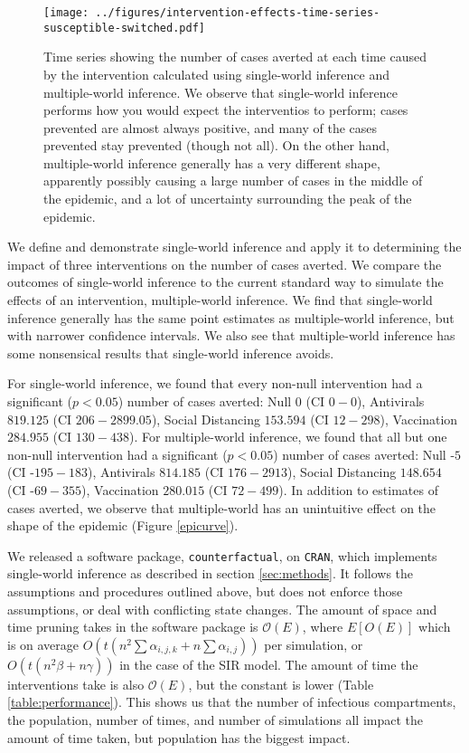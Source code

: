 \documentclass[PTRSB]{rsos}
\begin{document}
\begin{figure}[hp]
\centering
\texttt{[image: ../figures/intervention-effects-time-series-susceptible-switched.pdf]}
\caption{Time series showing the number of cases averted at each time caused by the intervention calculated using single-world inference and multiple-world inference.  We observe that single-world inference performs how you would expect the interventios to perform; cases prevented are almost always positive, and many of the cases prevented stay prevented (though not all). On the other hand, multiple-world inference generally has a very different shape, apparently possibly causing a large number of cases in the middle of the epidemic, and a lot of uncertainty surrounding the peak of the epidemic.}
\label{fig:epicurve}
\end{figure}

We define and demonstrate single-world inference and apply it to determining the impact of three interventions on the number of cases averted.
We compare the outcomes of single-world inference to the current standard way to simulate the effects of an intervention, multiple-world inference.
We find that single-world inference generally has the same point estimates as multiple-world inference, but with narrower confidence intervals.
We also see that multiple-world inference has some nonsensical results that single-world inference avoids.

For single-world inference, we found that every non-null intervention had a significant ($p<0.05$) number of cases averted: Null $0$ (CI $0-0$), Antivirals $819.125$ (CI $206 - 2899.05$), Social Distancing $153.594 $ (CI $12 - 298$), Vaccination $ 284.955 $ (CI $130 - 438$).
For multiple-world inference, we found that all but one non-null intervention had a significant ($p<0.05$) number of cases averted: Null  -$5 $ (CI  -$195 - 183$), Antivirals $814.185$ (CI $176 - 2913 $), Social Distancing $148.654$ (CI -$69 - 355$), Vaccination $280.015$ (CI $72 - 499$).
In addition to estimates of cases averted, we observe that multiple-world has an unintuitive effect on the shape of the epidemic (Figure \ref{epicurve}).

We released a software package, \texttt{counterfactual}, on \texttt{CRAN}, %
which implements single-world inference as described in section \ref{sec:methods}.
It follows the assumptions and procedures outlined above, but does not enforce those assumptions, or deal with conflicting state changes.
The amount of space and time pruning takes in the software package is $\mathcal O(E)$, where $E[O(E)]$ which is on average $O(t(n^2\sum \alpha_{i,j,k} + n \sum\alpha_{i,j}))$ per simulation, or $O(t(n^2\beta + n\gamma))$ in the case of the SIR model.
The amount of time the interventions take is also $\mathcal O(E)$, but the constant is lower (Table \ref{table:performance}).
This shows us that the number of infectious compartments, the population, number of times, and number of simulations all impact the amount of time taken, but population has the biggest impact.
\end{document}

